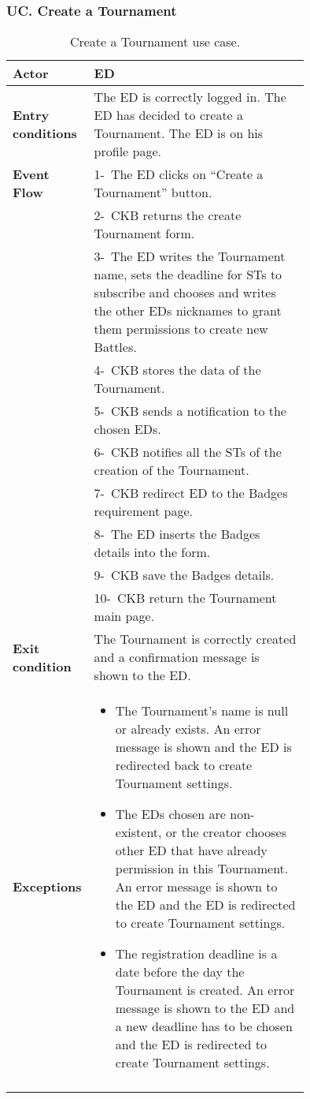 \subsubsection*{UC\cuc . Create a Tournament}
\begin{center}
    \begin{longtable}{|l|p{0.75\linewidth}|}
        \hline
        \textbf{Actor}            & ED\\
        \hline
        \textbf{Entry conditions} & The ED is correctly logged in. The ED has decided to create a Tournament. The ED is on his profile page. \\
        \hline
        \textbf{Event Flow}       & 1-\ The ED clicks on “Create a Tournament” button.       \\
        & 2-\ CKB returns the create Tournament form.   \\
        & 3-\ The ED writes the Tournament name, sets the deadline for STs to subscribe and chooses and writes the other EDs nicknames to grant them permissions to create new Battles.        \\
        & 4-\ CKB stores the data of the Tournament.        \\
        & 5-\ CKB sends a notification to the chosen EDs.        \\
        & 6-\ CKB notifies all the STs of the creation of the Tournament.        \\
        & 7-\ CKB redirect ED to the Badges requirement page. \\
        & 8-\ The ED inserts the Badges details into the form. \\
        & 9-\ CKB save the Badges details. \\
        & 10-\ CKB return the Tournament main page.        \\
        \hline
        \textbf{Exit condition}   & The Tournament is correctly created and a confirmation message is shown to the ED.        \\
        \hline
        \textbf{Exceptions}        & \begin{itemize}
            \item The Tournament’s name is null or already exists. An error message is shown and the ED is redirected back to create Tournament settings.
            \item The EDs chosen are non-existent, or the creator chooses other ED that have already permission in this Tournament. An error message is shown to the ED and the ED is redirected to create Tournament settings.
            \item The registration deadline is a date before the day the Tournament is created. An error message is shown to the ED and a new deadline has to be chosen and the ED  is redirected to create Tournament settings.
         \end{itemize}    \\
        \hline
        \caption{Create a Tournament use case.}
        \label{tab: create_a_Tournament_use_case}
    \end{longtable}
\end{center}

